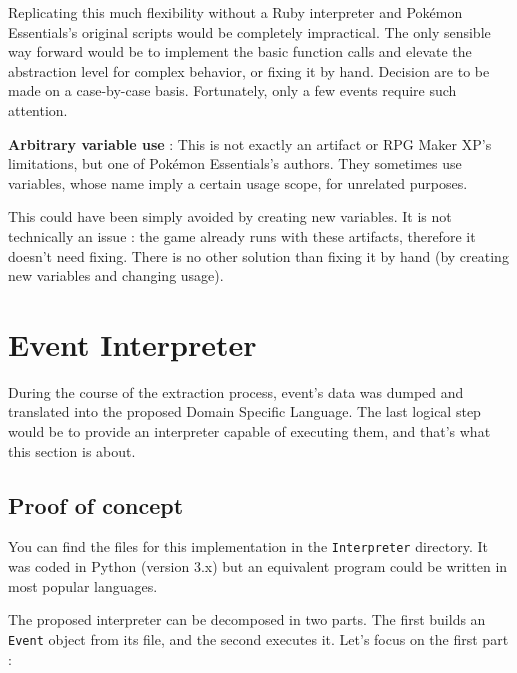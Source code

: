 \documentclass[11pt]{article}
\begin{document}
{Replicating this much flexibility without a Ruby interpreter and Pokémon Essentials's original scripts would be completely impractical. The only sensible way forward would be to implement the basic function calls and elevate the abstraction level for complex behavior, or fixing it by hand. Decision are to be made on a case-by-case basis. Fortunately, only a few events require such attention.

\textbf{Arbitrary variable use} : This is not exactly an artifact or RPG Maker XP's limitations, but one of Pokémon Essentials's authors. They sometimes use variables,  whose name imply a certain usage scope, for unrelated purposes. 

This could have been simply avoided by creating new variables. It is not technically an issue : the game already runs with these artifacts, therefore it doesn't need fixing. There is no other solution than fixing it by hand (by creating new variables and changing usage).











\newpage 
\section{Event Interpreter}


During the course of the extraction process, event's data was dumped and translated into the proposed Domain Specific Language. The last logical step would be to provide an interpreter capable of executing them, and that's what this section is about.

\subsection{Proof of concept}

You can find the files for this implementation in the \texttt{Interpreter} directory. It was coded in Python (version 3.x) but an equivalent program could be written in most popular languages.

The proposed interpreter can be decomposed in two parts. The first builds an \texttt{Event} object from its file, and the second executes it. Let's focus on the first part :

}
\end{document}
